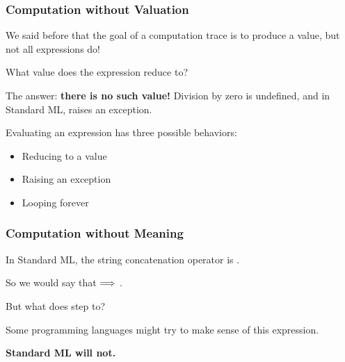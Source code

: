 \documentclass[aspectratio=169]{beamer}
\begin{document}
\begin{frame}[plain]
  \frametitle{Computation without Valuation}

  We said before that the goal of a computation trace is to produce a value, but not 
  all expressions do!

  \pause
  \vspace{\fill}

  What value does the expression  reduce to?

  \pause
  \vspace{\fill}

  The answer: \textbf{there is no such value!} Division by zero is undefined, and in
  Standard ML, raises an exception.

  \pause
  \vspace{\fill}

  Evaluating an expression has three possible behaviors:
  \begin{itemize}
    \item Reducing to a value
    \item Raising an exception
    \item Looping forever
  \end{itemize}

\end{frame}

\begin{frame}[plain]
  \frametitle{Computation without Meaning}

  In Standard ML, the string concatenation operator is \code{^}.

  \vspace{5pt}

  So we would say that  $\Longrightarrow$ .

  \pause
  \vspace{5pt}

  But what does  step to?

  \pause
  \vspace{\fill}

  Some programming languages might try to make sense of this expression.

  \vspace{5pt}

  \textbf{Standard ML will not.}
\end{frame}
\end{document}
